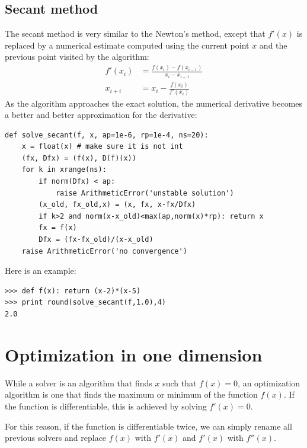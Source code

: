 \documentclass[justified,sixbynine]{tufte-book}
\def\ft{\small\tt}
\theoremstyle{plain}%
\theoremstyle{definition}
\theoremstyle{remark}
\begin{document}
\begin{fullwidth}
\goodbreak\subsection{Secant method}


The secant method is very similar to the Newton's method, except that $f'(x)$ is replaced by a numerical estimate computed using the current point $x$ and the previous point visited by the algorithm:
\begin{align}
f'(x_i) &= \frac{f(x_i)-f(x_{i-1})}{x_i-x_{i-1}} \\
x_{i+i} &= x_i - \frac{f(x_i)}{f'(x_i)}
\end{align}
As the algorithm approaches the exact solution, the numerical derivative becomes a better and better approximation for the derivative:

\begin{lstlisting}[caption={in file: {\ft nlib.py}}]
def solve_secant(f, x, ap=1e-6, rp=1e-4, ns=20):
    x = float(x) # make sure it is not int
    (fx, Dfx) = (f(x), D(f)(x))
    for k in xrange(ns):
        if norm(Dfx) < ap:
            raise ArithmeticError('unstable solution')
        (x_old, fx_old,x) = (x, fx, x-fx/Dfx)
        if k>2 and norm(x-x_old)<max(ap,norm(x)*rp): return x
        fx = f(x)
        Dfx = (fx-fx_old)/(x-x_old)
    raise ArithmeticError('no convergence')
\end{lstlisting}

Here is an example:

\begin{lstlisting}[caption={in file: {\ft nlib.py}}]
>>> def f(x): return (x-2)*(x-5)
>>> print round(solve_secant(f,1.0),4)
2.0
\end{lstlisting}

\goodbreak\section{Optimization in one dimension}


While a solver is an algorithm that finds $x$ such that $f(x)=0$, an optimization algorithm is one that finds the maximum or minimum of the function $f(x)$. If the function is differentiable, this is achieved by solving $f'(x)=0$.

For this reason, if the function is differentiable twice, we can simply rename all previous solvers and replace $f(x)$ with $f'(x)$ and $f'(x)$ with $f''(x)$.


\end{fullwidth}
\end{document}
